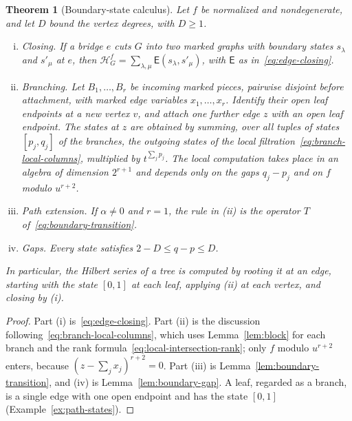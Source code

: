 \documentclass[reqno]{article}
\theoremstyle{plain} %
\newtheorem{theorem}{Theorem}[section]
\theoremstyle{definition}
\theoremstyle{remark}
\newcommand{\hs}{\mathscr{H}}
\numberwithin{equation}{section}
\begin{document}
\begin{theorem}[Boundary-state calculus]\label{thm:calculus}
Let $f$ be normalized and nondegenerate, and let $D$ bound the vertex
degrees, with $D\ge1$.
\begin{enumerate}[(i)]
\item \emph{Closing.} If a bridge $e$ cuts $G$ into two marked graphs
with boundary states $s_\lambda$ and $s'_\mu$ at $e$, then
$\hs^f_G=\sum_{\lambda,\mu}\mathsf E(s_\lambda,s'_\mu)$, with
$\mathsf E$ as in~\eqref{eq:edge-closing}.
\item \emph{Branching.} Let $B_1,\ldots,B_r$ be incoming marked pieces,
pairwise disjoint before attachment, with marked edge variables
$x_1,\ldots,x_r$. Identify their open leaf endpoints at a new vertex $v$, and attach one further edge $z$ with an open leaf
endpoint. The states at $z$ are obtained by summing, over all tuples of states
$[p_j,q_j]$ of the branches, the outgoing states of the local
filtration~\eqref{eq:branch-local-columns}, multiplied by
$t^{\sum_jp_j}$. The local computation takes place in an algebra of
dimension $2^{r+1}$ and depends only on the gaps $q_j-p_j$ and on $f$
modulo $u^{r+2}$.
\item \emph{Path extension.} If $\alpha\ne0$ and $r=1$, the rule in (ii)
is the operator $T$ of~\eqref{eq:boundary-transition}.
\item \emph{Gaps.} Every state satisfies $2-D\le q-p\le D$.
\end{enumerate}
In particular, the Hilbert series of a tree is computed by rooting it at
an edge, starting with the state $[0,1]$ at each leaf, applying (ii) at
each vertex, and closing by (i).
\end{theorem}
\begin{proof}
Part (i) is~\eqref{eq:edge-closing}. Part (ii) is the discussion
following~\eqref{eq:branch-local-columns}, which uses
Lemma~\ref{lem:block} for each branch and the rank
formula~\eqref{eq:local-intersection-rank}; only $f$ modulo $u^{r+2}$
enters, because $(z-\sum_jx_j)^{r+2}=0$. Part (iii) is
Lemma~\ref{lem:boundary-transition}, and (iv) is
Lemma~\ref{lem:boundary-gap}. A leaf, regarded as a branch, is a single
edge with one open endpoint and has the state $[0,1]$
(Example~\ref{ex:path-states}).
\end{proof}
\end{document}
